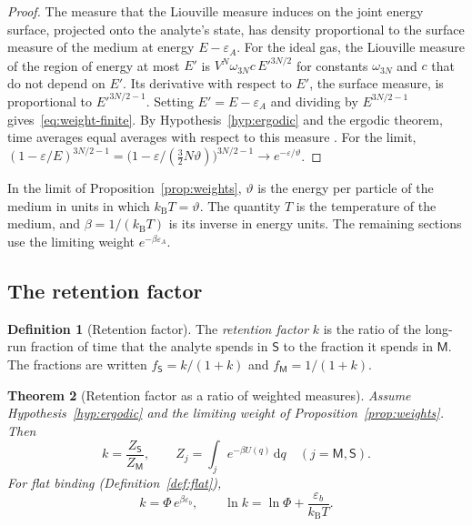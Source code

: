 \documentclass[11pt,a4paper]{article}
\newtheorem{theorem}{Theorem}[section]
\theoremstyle{definition}
\newtheorem{definition}[theorem]{Definition}
\theoremstyle{remark}
\newcommand{\kB}{k_{\mathrm{B}}}
\newcommand{\dd}{\mathrm{d}}
\newcommand{\Mob}{\mathsf{M}}
\newcommand{\Sta}{\mathsf{S}}
\begin{document}
\begin{proof}
The measure that the Liouville measure induces on the joint energy surface, projected onto the analyte's state, has density proportional to the surface measure of the medium at energy $E-\varepsilon_A$.
For the ideal gas, the Liouville measure of the region of energy at most $E'$ is $V^{N}\omega_{3N}c\,E'^{3N/2}$ for constants $\omega_{3N}$ and $c$ that do not depend on $E'$.
Its derivative with respect to $E'$, the surface measure, is proportional to $E'^{3N/2-1}$.
Setting $E'=E-\varepsilon_A$ and dividing by $E^{3N/2-1}$ gives~\eqref{eq:weight-finite}.
By Hypothesis~\ref{hyp:ergodic} and the ergodic theorem, time averages equal averages with respect to this measure \citep{birkhoff1931}.
For the limit, $(1-\varepsilon/E)^{3N/2-1}=\bigl(1-\varepsilon/(\tfrac32N\vartheta)\bigr)^{3N/2-1}\to e^{-\varepsilon/\vartheta}$.
\end{proof}

In the limit of Proposition~\ref{prop:weights}, $\vartheta$ is the energy per particle of the medium in units in which $\kB T=\vartheta$.
The quantity $T$ is the temperature of the medium, and $\beta=1/(\kB T)$ is its inverse in energy units.
The remaining sections use the limiting weight $e^{-\beta\varepsilon_A}$.

\subsection{The retention factor}

\begin{definition}[Retention factor]
\label{def:k}
The \emph{retention factor} $k$ is the ratio of the long-run fraction of time that the analyte spends in $\Sta$ to the fraction it spends in $\Mob$.
The fractions are written $f_\Sta=k/(1+k)$ and $f_\Mob=1/(1+k)$.
\end{definition}

\begin{theorem}[Retention factor as a ratio of weighted measures]
\label{thm:k}
Assume Hypothesis~\ref{hyp:ergodic} and the limiting weight of Proposition~\ref{prop:weights}.
Then
\begin{equation}
k=\frac{Z_\Sta}{Z_\Mob},\qquad Z_j=\int_{j}e^{-\beta U(q)}\,\dd q\quad(j=\Mob,\Sta).
\label{eq:k}
\end{equation}
For flat binding (Definition~\ref{def:flat}),
\begin{equation}
k=\Phi\,e^{\beta\varepsilon_b},\qquad \ln k=\ln\Phi+\frac{\varepsilon_b}{\kB T}.
\label{eq:k-flat}
\end{equation}
\end{theorem}
\end{document}
